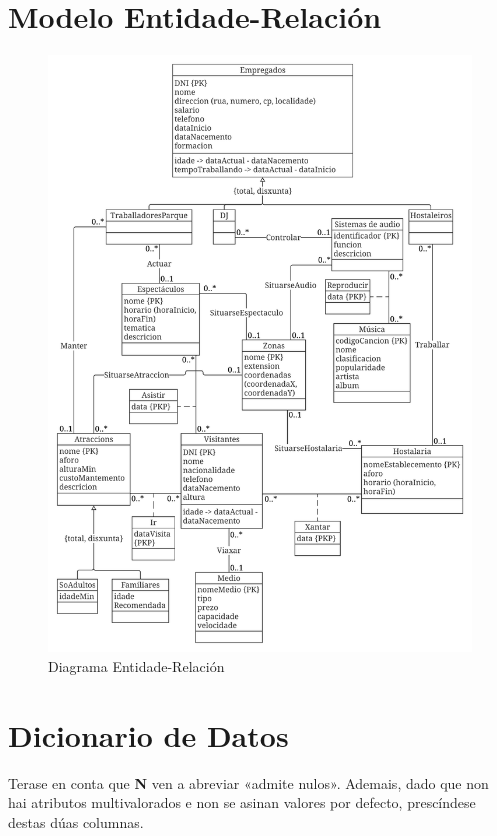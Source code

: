 \documentclass[12pt,a4paper]{book}
\theoremstyle{definition}
\theoremstyle{break}
\begin{document}
	
	\newpage
	
	\section{Modelo Entidade-Relación}
	
	\begin{figure} [H] \centering
		\caption{Diagrama Entidade-Relación}
		\includegraphics[width=\textwidth]{MER.pdf}
	\end{figure}
	\newpage
	
	\section{Dicionario de Datos}
	
	Terase en conta que \textbf{N} ven a abreviar «admite nulos». Ademais, dado que non hai atributos multivalorados e non se asinan valores por defecto, prescíndese destas dúas columnas.
	
\end{document}
